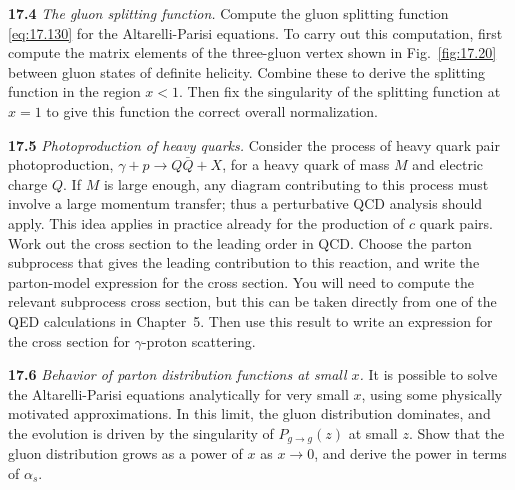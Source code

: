 \textbf{17.4} \emph{The gluon splitting function.}  Compute the gluon
splitting function \eqref{eq:17.130} for the Altarelli-Parisi equations.  To
carry out this computation, first compute the matrix elements of the
three-gluon vertex shown in Fig.~\ref{fig:17.20} between gluon states of
definite helicity.  Combine these to derive the splitting function in the
region $x < 1$.  Then fix the singularity of the splitting function at
$x = 1$ to give this function the correct overall normalization.

\textbf{17.5} \emph{Photoproduction of heavy quarks.}  Consider the process of
heavy quark pair photoproduction, $\gamma + p \to Q\bar{Q} + X$, for a heavy
quark of mass $M$ and electric charge $Q$.  If $M$ is large enough, any
diagram contributing to this process must involve a large momentum transfer;
thus a perturbative QCD analysis should apply.  This idea applies in practice
already for the production of $c$ quark pairs.  Work out the cross section to
the leading order in QCD.  Choose the parton subprocess that gives the
leading contribution to this reaction, and write the parton-model expression
for the cross section.  You will need to compute the relevant subprocess
cross section, but this can be taken directly from one of the QED
calculations in Chapter~5.  Then use this result to write an expression for
the cross section for $\gamma$-proton scattering.

\textbf{17.6} \emph{Behavior of parton distribution functions at small $x$.}
It is possible to solve the Altarelli-Parisi equations analytically for very
small $x$, using some physically motivated approximations.  In this limit,
the gluon distribution dominates, and the evolution is driven by the
singularity of $P_{g\to g}(z)$ at small $z$.  Show that the gluon distribution
grows as a power of $x$ as $x\to 0$, and derive the power in terms of
$\alpha_s$.
